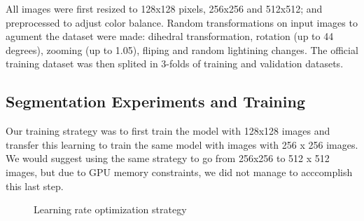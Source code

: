 All images were first resized to 128x128 pixels, 256x256 and 512x512; and preprocessed to adjust color balance. Random transformations on input images to agument the dataset were made: dihedral transformation, rotation (up to 44 degrees), zooming (up to 1.05), fliping and random lightining changes. The official training dataset was then splited in 3-folds of training and validation datasets.  


\subsection{Segmentation Experiments and Training}
\label{sec:seg_training}
Our training strategy was to first train the model with 128x128 images and transfer this learning to train the same model with images with 256 x 256 images. We would suggest using the same strategy to go from 256x256 to 512 x 512 images, but due to GPU memory constraints, we did not manage to acccomplish this last step.

\begin{figure}
  \centering
  \hfil
\caption{Learning rate optimization strategy}\label{lr_find_chart}
\end{figure}

